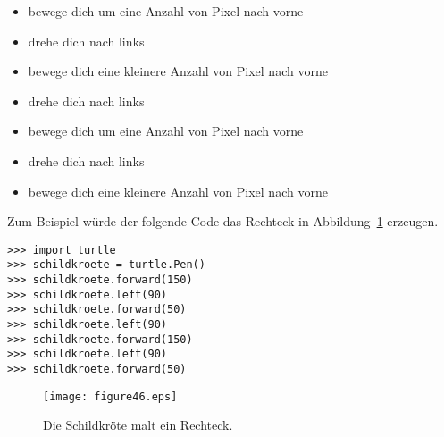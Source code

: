 \begin{itemize}
 \item bewege dich um eine Anzahl von Pixel nach vorne
 \item drehe dich nach links
 \item bewege dich eine kleinere Anzahl von Pixel nach vorne
 \item drehe dich nach links
 \item bewege dich um eine Anzahl von Pixel nach vorne
 \item drehe dich nach links
 \item bewege dich eine kleinere Anzahl von Pixel nach vorne
\end{itemize}
\noindent
Zum Beispiel würde der folgende Code das Rechteck in Abbildung~\ref{fig46} erzeugen.

\begin{Verbatim}[frame=single]
>>> import turtle
>>> schildkroete = turtle.Pen()
>>> schildkroete.forward(150)
>>> schildkroete.left(90)
>>> schildkroete.forward(50)
>>> schildkroete.left(90)
>>> schildkroete.forward(150)
>>> schildkroete.left(90)
>>> schildkroete.forward(50)
\end{Verbatim}

\begin{figure}
\begin{center}
\texttt{[image: figure46.eps]}
\end{center}
\caption{Die Schildkröte malt ein Rechteck.}\label{fig46}
\end{figure}

